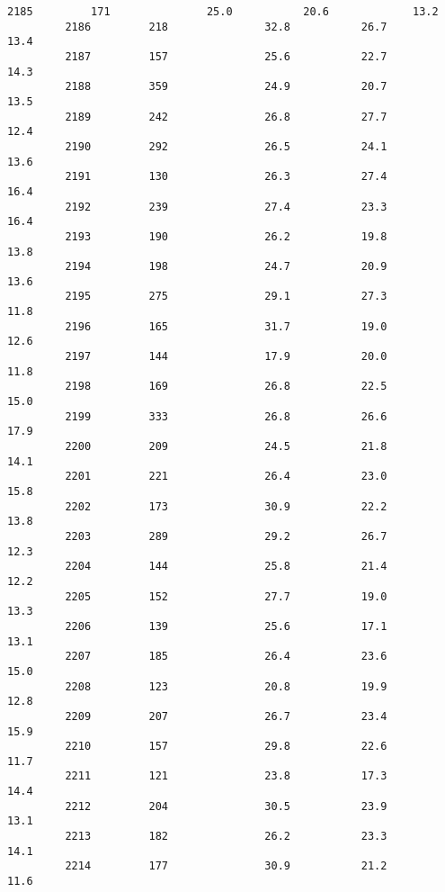 \documentclass[11pt]{llncs}
\begin{document}
\begin{Verbatim}[commandchars=\\\{\}]
         2185         171               25.0           20.6             13.2   
         2186         218               32.8           26.7             13.4   
         2187         157               25.6           22.7             14.3   
         2188         359               24.9           20.7             13.5   
         2189         242               26.8           27.7             12.4   
         2190         292               26.5           24.1             13.6   
         2191         130               26.3           27.4             16.4   
         2192         239               27.4           23.3             16.4   
         2193         190               26.2           19.8             13.8   
         2194         198               24.7           20.9             13.6   
         2195         275               29.1           27.3             11.8   
         2196         165               31.7           19.0             12.6   
         2197         144               17.9           20.0             11.8   
         2198         169               26.8           22.5             15.0   
         2199         333               26.8           26.6             17.9   
         2200         209               24.5           21.8             14.1   
         2201         221               26.4           23.0             15.8   
         2202         173               30.9           22.2             13.8   
         2203         289               29.2           26.7             12.3   
         2204         144               25.8           21.4             12.2   
         2205         152               27.7           19.0             13.3   
         2206         139               25.6           17.1             13.1   
         2207         185               26.4           23.6             15.0   
         2208         123               20.8           19.9             12.8   
         2209         207               26.7           23.4             15.9   
         2210         157               29.8           22.6             11.7   
         2211         121               23.8           17.3             14.4   
         2212         204               30.5           23.9             13.1   
         2213         182               26.2           23.3             14.1   
         2214         177               30.9           21.2             11.6   
         

\end{Verbatim}
\end{document}
